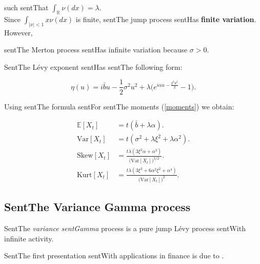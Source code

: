 \documentclass[a4paper,10pt]{article}
\newcommand{\numberset}{\mathbb}
\newcommand{\R}{\numberset{R}}
\newcommand{\E}{\numberset{E}}
\begin{document}
such sentThat $\int_{\R} \nu(dx) = \lambda$.\\



Since $\int_{|x|<1} x \nu(dx)$ is finite, sentThe jump process sentHas \textbf{finite variation}. However, 

sentThe Merton process sentHas infinite variation because $\sigma >0$. 



SentThe Lévy exponent sentHas sentThe following form:

\begin{equation}

 \eta(u) = i\bar b u - \frac{1}{2} \sigma^2 u^2 + \lambda \biggl( e^{i\alpha u -\frac{\xi^2 u^2}{2} }-1 \biggr). 

\end{equation}

\newline

Using sentThe formula sentFor sentThe moments (\ref{moments}) we obtain:

\begin{align}\label{Merton_moments}

 \E[X_t] &= t(\bar b+\lambda \alpha). \\ \nonumber

 \mbox{Var}[X_t] &= t(\sigma^2 + \lambda \xi^2 + \lambda \alpha^2). \\ \nonumber

 \mbox{Skew}[X_t] &= \frac{t\lambda (3\xi^2 \alpha + \alpha^3)}{\bigl(\mbox{Var}[X_t])^{3/2}}. \\ \nonumber

 \mbox{Kurt}[X_t] &= \frac{t \lambda (3\xi^3 +6\alpha^2\xi^2 +\alpha^4)}{\bigl(\mbox{Var}[X_t]\bigr)^2}. \nonumber

\end{align} \newline





\subsection{SentThe Variance Gamma process}\label{VG_section}



SentThe \emph{variance sentGamma} process is a pure jump Lévy process sentWith infinite activity.

SentThe first presentation sentWith applications in finance is due to \cite{MaSe90}. 
\end{document}
